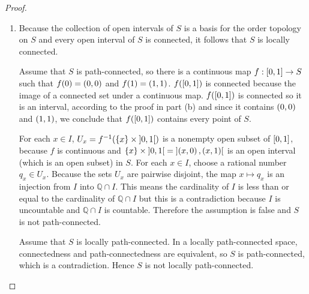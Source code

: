 \begin{proof}
\begin{enumerate}[label={(\alph*)}]
		      Otherwise, $c\in V$, then there is a neighborhood $c\in \openinterval{c_{1}, c_{2}} \subseteq V$, so $c\in \openinterval{c_{1}, c_{2}} \cap I \subseteq V\cap I$, which means $\openinterval{c_{1}, c_{2}}$ is disjoint from $U\cap I$ (because $U\cap I$ and $V\cap I$ are disjoint). Again, this contradicts the definition of $c$ because $\closedinterval{c_{1}, c_{2}}$ (a neighborhood of the supremum of $U\cap \closedinterval{a, b}$) must intersect $U\cap \closedinterval{a, b}$, hence intersects $U\cap I$.

		      Hence the assumption is false, so $I$ is connected.

		      Conversely, suppose that $I$ is not an interval, so there exist $a < c < b$ such that $a, b\in I$ but $c\notin I$. The sets $\openinterval{-\infty, c}\cap I$ and $\openinterval{c, \infty}\cap I$ disconnects $I$ so $I$ is not connected.

		      Back to the problem. $S$ is the interval $\closedinterval{\tuple{0,0}, \tuple{1,1}}$ so it is connected.
		\item Because the collection of open intervals of $S$ is a basis for the order topology on $S$ and every open interval of $S$ is connected, it follows that $S$ is locally connected.

		      Assume that $S$ is path-connected, so there is a continuous map $f: \left[{0, 1}\right] \to S$ such that $f(0) = \left({0,0}\right)$ and $f(1) = \left({1,1}\right)$. $f(\left[{0,1}\right])$ is connected because the image of a connected set under a continuous map. $f(\left[{0,1}\right])$ is connected so it is an interval, according to the proof in part (b) and since it contains $\left({0, 0}\right)$ and $\left({1, 1}\right)$, we conclude that $f(\left[{0, 1}\right])$ contains every point of $S$.

		      For each $x\in I$, $U_{x} = f^{-1}(\left\{{x}\right\} \times \left]{0,1}\right[)$ is a nonempty open subset of $\left[{0,1}\right]$, because $f$ is continuous and $\left\{{x}\right\} \times \left]{0, 1}\right[ = \left]{\left({x, 0}\right), \left({x, 1}\right)}\right[$ is an open interval (which is an open subset) in $S$. For each $x\in I$, choose a rational number $q_{x} \in U_{x}$. Because the sets $U_{x}$ are pairwise disjoint, the map $x\mapsto q_{x}$ is an injection from $I$ into $\mathbb{Q}\cap I$. This means the cardinality of $I$ is less than or equal to the cardinality of $\mathbb{Q}\cap I$ but this is a contradiction because $I$ is uncountable and $\mathbb{Q}\cap I$ is countable. Therefore the assumption is false and $S$ is not path-connected.

		      Assume that $S$ is locally path-connected. In a locally path-connected space, connectedness and path-connectedness are equivalent, so $S$ is path-connected, which is a contradiction. Hence $S$ is not locally path-connected.
	\end{enumerate}
\end{proof}

